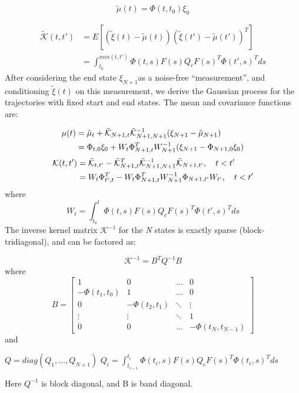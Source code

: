 \documentclass{IEEEtran}
\begin{document}
\begin{equation}
\tilde{\mu}(t)=\Phi(t,{t_0}){\xi_0}
\end{equation}

\begin{equation}
\begin{split}
\tilde{\mathcal{K}}(t,t')&=E[(\tilde{\xi}(t)-\tilde{\mu}(t)){(\tilde{\xi}(t')-\tilde{\mu}(t'))}^T]\\
&=\int_{t_0}^{min(t,t')}\Phi(t,s)F(s)Q_c{F(s)}^T{\Phi(t',s)}^Tds
\end{split}
\end{equation}
After considering the end state $\xi_{N+1}$as a noise-free “measurement”, and conditioning $\tilde{\xi}(t)$ on this measurement, we
derive the Gaussian process for the trajectories with fixed
start and end states. The mean and covariance functions are:

\begin{align}
\mu(t)&=\tilde{\mu}_t+\tilde{\mathcal{K}}_{{N+1},t}{\tilde{\mathcal{K}}_{{N+1},{N+1}}}^{-1}(\xi_{N+1}-\tilde{\mu}_{N+1})\\
&=\Phi_{t,0}\xi_0+W_t\Phi^T_{{N+1},t}W^{-1}_{N+1}(\xi_{N+1}-\Phi_{{N+1},0}\xi_0)\notag
\end{align}
\begin{align}
\mathcal{K}(t,t')&={\tilde{\mathcal{K}}}_{t,t'}-{\tilde{\mathcal{K}}}^{T}_{{N+1},t}{\tilde{\mathcal{K}}}^{-1}_{{N+1},{N+1}}\tilde{\mathcal{K}}_{{N+1},t'},\quad t<t'\\
&=W_t\Phi^T_{t',t}-W_t\Phi^{T}_{{N+1},t}W^{-1}_{N+1}\Phi_{{N+1},t'}W_{t'},\quad t<t'\notag
\end{align}
where
\begin{equation}
W_t=\int_{t_0}^{t}\Phi(t,s)F(s)Q_c{F(s)}^T{\Phi(t',s)}^Tds
\end{equation}
The inverse kernel matrix ${\mathcal{K}}^{-1}$
for the \textit{N} states is exactly
sparse (block-tridiagonal), and can be factored as:

\begin{equation}
{\mathcal{K}}^{-1}=B^TQ^{-1}B
\end{equation}
where
\[
B=\begin{bmatrix}
1&0 &\dots &0\\
{-\Phi({t_1},{t_0})}&1 &\dots  &0\\
0&{-\Phi({t_2},{t_1})}&\ddots&\vdots\\
\vdots&\vdots&\ddots&1\\
0&0 &\dots &{-\Phi({t_N},{t_{N-1}})}
\end{bmatrix}
\]
and
\begin{center}
$Q=diag(Q_1,\dots,Q_{N+1})$
$Q_i=\int_{t_{i-1}}^{t_i}\Phi(t_i,s)F(s)Q_c{F(s)}^T{\Phi(t_i,s)}^Tds$
\end{center}
Here $Q^{-1}$
is block diagonal, and B is band diagonal.
\end{document}
